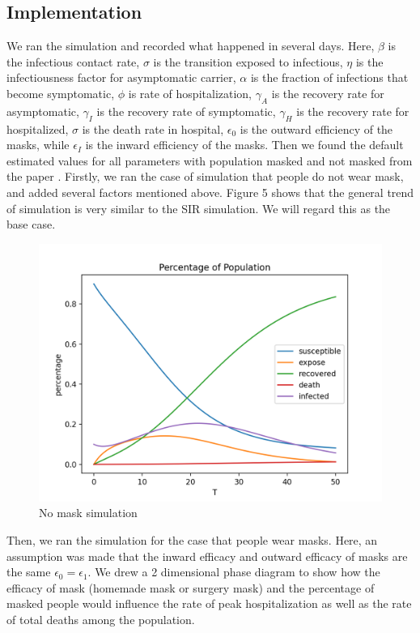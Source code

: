 \documentclass{article}
\begin{document}
 \subsection{Implementation}

 We ran the simulation and recorded what happened in several days. Here, $\beta $ is the infectious contact rate, $\sigma $ is the transition exposed to infectious, $\eta $ is the infectiousness factor for asymptomatic carrier, $\alpha$ is the fraction of infections that become symptomatic, $\phi$ is rate of hospitalization, $\gamma_{A}$ is the recovery rate for asymptomatic, $\gamma_{I}$ is the recovery rate of  symptomatic, $\gamma_{H}$ is the recovery rate for hospitalized, $\sigma$ is the death rate in hospital, $\epsilon_{0}$ is the outward efficiency of the masks, while $\epsilon_{I}$ is the inward efficiency of the masks. Then we found the default estimated values for all parameters with population masked and not masked from the paper \cite{Steff2020mask}. Firstly, we ran the case of simulation that people do not wear mask, and added several factors mentioned above. Figure 5 shows that the general trend of simulation is very similar to the SIR simulation. We will regard this as the base case. 


 \begin{figure}[htp]
 \centering
 \includegraphics[width=.3\textwidth]{masksimulation.png}
 \caption{No mask simulation}
 \label{fig:figure5}
 \end{figure}

Then, we ran the simulation for the case that people wear masks.
Here, an assumption was made that the inward efficacy and outward efficacy of masks are the same $\epsilon_{0} = \epsilon_{1}$. We drew a 2 dimensional phase diagram to show how the efficacy of mask (homemade mask or surgery mask) and the percentage of masked people would influence the rate of peak hospitalization as well as the rate of total deaths among the population. 
\end{document}
